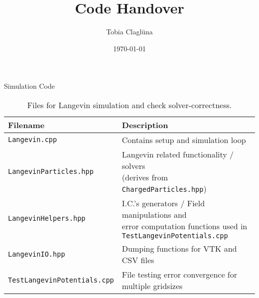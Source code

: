 

\title[\today]{Code Handover}

\author{Tobia Claglüna}
\date{\today}
\def \myEmail {tobia.clagluena@psi.ch}




\begin{frame}{Simulation Code}
\begin{table}[h]
    \centering
    \caption{Files for Langevin simulation and check solver-correctness.}
    \begin{tabular}[t]{l l}
        \toprule
        Filename & Description \\
        \midrule
        \texttt{Langevin.cpp} & Contains setup and simulation loop \\
        \rule{0pt}{5ex}%
        \texttt{LangevinParticles.hpp} & \makecell[l]{Langevin related functionality / solvers \\(derives from
        \texttt{ChargedParticles.hpp})} \\
        \rule{0pt}{7ex}%
        \texttt{LangevinHelpers.hpp} & \makecell[l]{I.C.'s generators / Field manipulations and \\ error computation
        functions used in \\ \texttt{TestLangevinPotentials.cpp}} \\
        \rule{0pt}{5ex}%
        \texttt{LangevinIO.hpp} & Dumping functions for VTK and CSV files \\
        \rule{0pt}{5ex}%
        \texttt{TestLangevinPotentials.cpp} & File testing error convergence for multiple gridsizes \\
        \bottomrule
    \end{tabular}
    \label{table:files_langevin}
\end{table}

\end{frame}

